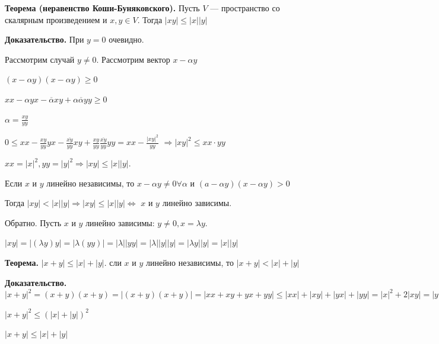 \documentclass[a4paper]{article}
\begin{document}
    \begin{htheorem}
        \textbf{Теорема (неравенство Коши-Буняковского).} Пусть $V$ --- пространство со скалярным произведением и $x,y \in V$. Тогда $|xy| \leq |x||y|$
    \end{htheorem}

    \begin{hproof}
        \textbf{Доказательство.} При $y=0$ очевидно.

        Рассмотрим случай $y \neq 0$. Рассмотрим вектор $x -\alpha y$

        $(x-\alpha y)(x-\alpha y) \geq 0$

        $xx - \alpha y x - \overline{\alpha} x y + \alpha \overline{\alpha} y y \geq 0$

        $\displaystyle \alpha = \frac{xy}{yy}$

        $\displaystyle 0 \leq xx - \frac{xy}{yy} yx - \frac{\overline{xy}}{yy} xy +  \frac{xy}{yy} \frac{\overline{xy}}{yy} yy = xx - \frac{|xy|^2}{yy}$ $\Rightarrow |xy|^2 \leq xx \cdot yy$

        $xx = |x|^2, yy = |y|^2 \Rightarrow |xy| \leq |x||y|$.

        Если $x$ и $y$ линейно независимы, то $x- \alpha y \neq 0 \forall \alpha$ и $(a-\alpha y)(x-\alpha y) > 0$

        Тогда $|xy| < |x||y| \Rightarrow |xy| \leq |x||y| \Leftrightarrow$ $x$ и $y$ линейно зависимы.

        Обратно. Пусть $x$ и $y$ линейно зависимы: $y \neq 0, x = \lambda y$.

        $|xy| = |(\lambda y) y| = |\lambda (yy)| = |\lambda| |yy| = |\lambda||y||y| = |\lambda y||y| = |x||y|$
    \end{hproof}

    \begin{htheorem}
        \textbf{Теорема.} $|x+y| \leq |x|+|y|$. сли $x$ и $y$ линейно независимы, то $|x+y| < |x|+ |y|$
    \end{htheorem}

    \begin{hproof}
        \textbf{Доказательство.}
        $|x+y|^2 = (x+y)(x+y) = |(x+y)(x+y)| = |xx+xy+yx+yy| \leq |xx| + |xy| + |yx| + |yy| = |x|^2 + 2|xy| = |y|^2 \leq |x|^2 + 2|x||y| + |y|^2 = (|x| + |y|)^2$

        $|x+y|^2 \leq (|x| + |y|)^2$

        $|x+y| \leq |x| + |y|$
    \end{hproof}
\end{document}
